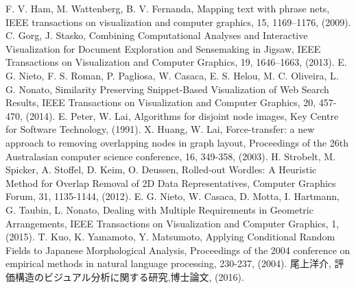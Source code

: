 \documentclass[syuuron]{kuee}
\begin{document}
\begin{thebibliography}{数字}
	 F. V. Ham, M. Wattenberg, B. V. Fernanda, Mapping text with phrase nets, IEEE transactions on visualization and computer graphics, 15, 1169–1176, (2009).
	 C. Gorg, J. Stasko, Combining Computational Analyses and Interactive Visualization for Document Exploration and Sensemaking in Jigsaw, IEEE Transactions on Visualization and Computer Graphics, 19, 1646–1663, (2013).
	 E. G. Nieto, F. S. Roman, P. Pagliosa, W. Casaca, E. S. Helou, M. C. Oliveira, L. G. Nonato, Similarity Preserving Snippet-Based Visualization of Web Search Results, IEEE Transactions on Visualization and Computer Graphics, 20, 457-470, (2014).
	 E. Peter, W. Lai, Algorithms for disjoint node images, Key Centre for Software Technology, (1991).
	 X. Huang, W. Lai, Force-transfer: a new approach to removing overlapping nodes in graph layout, Proceedings of the 26th Australasian computer science conference, 16, 349-358, (2003).
	 H. Strobelt, M. Spicker, A. Stoffel, D. Keim, O. Deussen, Rolled‐out Wordles: A Heuristic Method for Overlap Removal of 2D Data Representatives, Computer Graphics Forum, 31, 1135-1144, (2012).
	 E. G. Nieto, W. Casaca, D. Motta, I. Hartmann, G. Taubin, L. Nonato, Dealing with Multiple Requirements in Geometric Arrangements, IEEE Transactions on Visualization and Computer Graphics, 1, (2015).
	 T. Kuo, K. Yamamoto, Y. Matsumoto, Applying Conditional Random Fields to Japanese Morphological Analysis, Proceedings of the 2004 conference on empirical methods in natural language processing, 230-237, (2004).
	 尾上洋介, 評価構造のビジュアル分析に関する研究,博士論文, (2016).
\end{thebibliography}

\appendix
\end{document}
